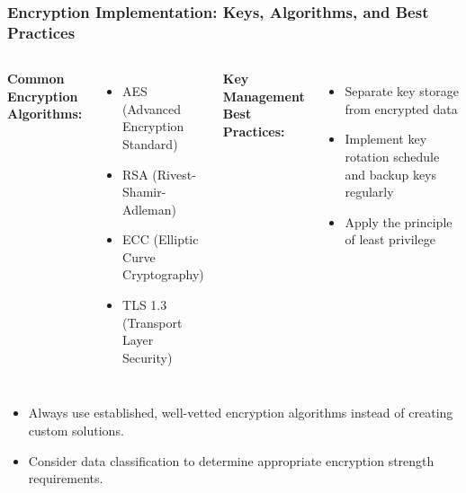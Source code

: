 \documentclass{beamer}
\begin{document}
    \begin{frame}
    \frametitle{Encryption Implementation: Keys, Algorithms, and Best Practices}
    
    \begin{columns}[T]
    \textbf{Common Encryption Algorithms:}
    \begin{itemize}
    \item AES (Advanced Encryption Standard)
    \item RSA (Rivest-Shamir-Adleman)
    \item ECC (Elliptic Curve Cryptography)
    \item TLS 1.3 (Transport Layer Security)
    \end{itemize}
    
    \textbf{Key Management Best Practices:}
    \begin{itemize}
    \item Separate key storage from encrypted data
    \item Implement key rotation schedule and backup keys regularly
    \item Apply the principle of least privilege
    \end{itemize}
    \end{columns}
    
    \vspace{0.5cm}
    \begin{itemize}
    \item Always use established, well-vetted encryption algorithms instead of creating custom solutions.
    \item Consider data classification to determine appropriate encryption strength requirements.
    \end{itemize}

    \end{frame}
    
\end{document}
